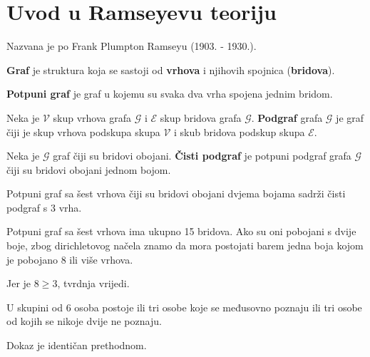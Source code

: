 \section{Uvod u Ramseyevu teoriju}

Nazvana je po Frank Plumpton Ramseyu (1903. - 1930.).

\begin{definition}[graf]
    \textbf{Graf} je struktura koja se sastoji od \textbf{vrhova} i njihovih
    spojnica (\textbf{bridova}).
\end{definition}

\begin{definition}
    \textbf{Potpuni graf} je graf u kojemu su svaka dva vrha spojena jednim
    bridom.
\end{definition}

\begin{definition}[podgraf]
    Neka je $\mathcal{V}$ skup vrhova grafa $\mathcal{G}$ i $\mathcal{E}$ skup
    bridova grafa $\mathcal{G}$. \textbf{Podgraf} grafa $\mathcal{G}$ je graf
    čiji je skup vrhova podskupa skupa $\mathcal{V}$ i skub bridova podskup
    skupa $\mathcal{E}$.
\end{definition}

\begin{definition}
    Neka je $\mathcal{G}$ graf čiji su bridovi obojani. \textbf{Čisti podgraf}
    je potpuni podgraf grafa $\mathcal{G}$ čiji su bridovi obojani jednom bojom.
\end{definition}

\begin{example}
    Potpuni graf sa šest vrhova čiji su bridovi obojani dvjema bojama sadrži
    čisti podgraf s 3 vrha.
\end{example}

Potpuni graf sa šest vrhova ima ukupno 15 bridova. Ako su oni pobojani s dvije
boje, zbog dirichletovog načela znamo da mora postojati barem jedna boja kojom
je pobojano 8 ili više vrhova.

Jer je $8 \geq 3$, tvrdnja vrijedi.

\begin{example}
    U skupini od 6 osoba postoje ili tri osobe koje se međusovno poznaju ili tri
    osobe od kojih se nikoje dvije ne poznaju.
\end{example}

Dokaz je identičan prethodnom.
